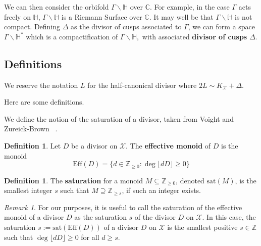 \documentclass{amsart}
\theoremstyle{plain}
\theoremstyle{definition}
\newtheorem{defn}[thm]{Definition}
\theoremstyle{remark}
\newtheorem{rem}[thm]{Remark}
\numberwithin{equation}{section}
\newcommand\bh{{\mathbb H}}
\newcommand\BC{{\mathbb C}}
\newcommand\BZ{{\mathbb Z}}
\newcommand \sx{\mathscr X}
\newcommand \halfcan{L}
\newcommand \Eff{\text{Eff}}
\newcommand \sat{\text{sat}}
\begin{document}
We can then consider the
orbifold $\Gamma \backslash \bh$ over $\BC$. For example, in the
case $\Gamma$ acts freely on $\bh$, $\Gamma \backslash \bh$ is a
Riemann Surface over $\BC$. It may well be that $\Gamma \backslash
\bh$ is not compact. Defining $\Delta$ as the divisor of cusps
associated to $\Gamma$, we can form a space $\Gamma \backslash
\bh^*$ which is a compactification of $\Gamma \backslash \bh,$ with
associated {\bf divisor of cusps} $\Delta$.

\subsection{Definitions}
We reserve the notation $\halfcan$ for the half-canonical divisor
where $2\halfcan \sim K_\sx + \Delta$.

Here are some definitions.

We define the notion of the saturation of a divisor, taken from
Voight and Zureick-Brown ~\cite[Section 7.2]{vzb:stacky}.

\begin{defn}
Let $D$ be a divisor on $\sx$. The \textbf{effective monoid} of $D$
is the monoid
\[
	\Eff(D) = \{d \in \BZ_{\geq 0} : \deg \lfloor dD \rfloor \geq 0 \}
\]
\end{defn}

\begin{defn}
\label{defn:sat}
The \textbf{saturation} for a monoid $M \subseteq \BZ_{\geq 0}$,
denoted $\sat(M)$, is the smallest integer $s$ such that $M
\supseteq \BZ_{\geq s}$, if such an integer exists.
\end{defn}

\begin{rem}
For our purposes, it is useful to call the saturation of the
effective monoid of a divisor $D$ as the saturation $s$ of the
divisor $D$ on $\sx$. In this case, the saturation $s :=
\sat(\Eff(D))$ of a divisor $D$ on $\sx$ is the smallest positive
$s \in \BZ$ such that $\deg \lfloor dD \rfloor \geq 0$ for all $d
\geq s$.
\end{rem}

\end{document}
